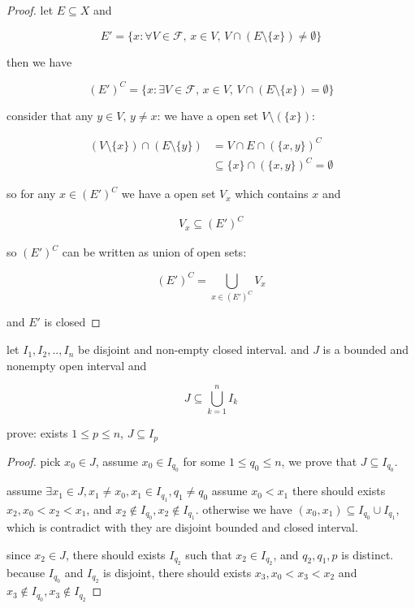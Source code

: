 \begin{proof}
   let $E \subseteq X$ and 
   
   \[
    E' = \{ x: \forall V \in \mathcal{F},\, x \in V,\, V \cap (E \setminus \{ x\}) \ne \emptyset \}
   \]

   then we have

   \[
    (E')^C = \{ x: \exists V \in \mathcal{F},\, x \in V,\, V \cap (E \setminus \{ x\}) = \emptyset \}
   \]

   consider that any $y \in V,\, y \ne x$: we have a open set $V \setminus (\{ x\})$:

   \begin{align*}
    (V \setminus \{x\} ) \cap (E \setminus \{y \}) &= V \cap E \cap (\{ x, y\})^C \\
    & \subseteq \{ x \} \cap (\{x, y\})^C = \emptyset
   \end{align*}


   so for any $x \in (E')^C$ we have a open set $V_x$ which contains $x$ and

   \begin{align*}
        V_x \subseteq (E')^C
   \end{align*}

   
   so $(E')^C$ can be written as union of open sets:

   \[
    (E')^C = \bigcup_{x \in (E')^C} V_x
   \]

   and $E'$ is closed

\end{proof}

\begin{exercise}
    let $I_1, I_2, .., I_n$ be disjoint and non-empty closed interval. and $J$ is a bounded and nonempty open interval and

    \[
        J \subseteq \bigcup_{k=1}^{n}I_k
    \]

    prove: exists $1\le p \le n$, $J \subseteq I_p$
\end{exercise}

\begin{proof}
    pick $x_0 \in J$, assume $x_0 \in I_{q_0}$ for some $1\le q_0 \le n$, we prove that $J \subseteq I_{q_0}$.

    assume $\exists x_1 \in J, x_1 \ne x_0, x_1 \in I_{q_1}, q_1 \ne q_0$
    assume $x_0 < x_1$ there should exists $x_2, x_0 < x_2 < x_1$, and
    $x_2 \notin I_{q_0}, x_2 \notin I_{q_1}$. otherwise we have $(x_0, x_1) \subseteq I_{q_0} \cup I_{q_1}$,
    which is contradict with they are disjoint bounded and closed interval.

    since $x_2 \in J$, there should exists $I_{q_2}$ such that $x_2 \in I_{q_2}$, and $q_2, q_1, p$ is distinct.
    because $I_{q_0}$ and $I_{q_2}$ is disjoint, there should exists $x_3, x_0 < x_3 < x_2$
    and $x_3 \notin I_{q_0}, x_3 \notin I_{q_2}$

\end{proof}

















